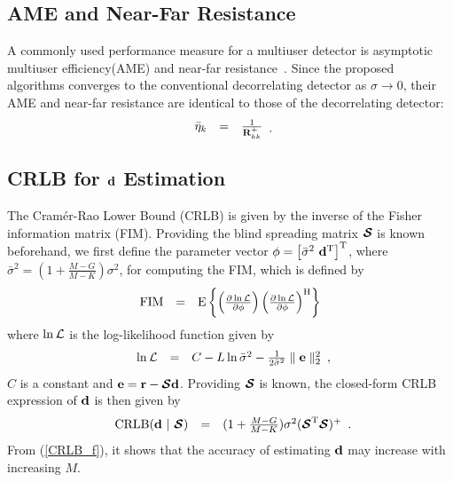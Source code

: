 \documentclass[a4paper,10pt,fleqn, twocolumn]{IEEETran}
\newcommand{\br}{{\mathbf r}}
\newcommand{\bbf}{{\bf d}}
\newcommand{\bR}{{\bf R}}
\newcommand{\bcS}{{\mbox {\boldmath ${\cal S}$}}}
\begin{document}
{\subsection{AME and Near-Far Resistance}
A commonly used performance measure for a multiuser detector is
asymptotic multiuser efficiency(AME) and near-far
resistance~\cite{Verd98}. Since the proposed algorithms converges
to the conventional decorrelating detector as $\sigma\rightarrow
0$, their AME and near-far resistance are identical to those of
the decorrelating detector:
\begin{equation}
\begin{array}{rcl}
\bar{\eta}_k&=&\frac{1}{\bR_{kk}^{+}}
\end{array}.
\end{equation}
\subsection{CRLB for $\bbf$ Estimation}
The Cram\'{e}r-Rao Lower Bound (CRLB) is given by the inverse of
the Fisher information matrix (FIM). Providing the blind spreading
matrix $\bcS$ is known beforehand, we first define the parameter
vector $\mathbf{\phi} = \left[\bar{\sigma}^{2}\ \bbf^{\rm
T}\right]^{\rm T}$, where $\bar{\sigma}^{2}
=(1+\frac{M-G}{M-K})\sigma^{2}$, for computing the FIM, which is
defined by
\begin{equation}
\begin{array}{rcl}
{\rm FIM} &=& {\rm E} \left\{ \left( \frac{\partial \ln{\cal
L}}{\partial \mathbf{\phi}} \right) \left( \frac{\partial \ln{\cal
L}}{\partial \mathbf{\phi}} \right)^{\rm H} \right\} \label{fim}
\end{array}
\end{equation}
\noindent where $\ln{\cal L}$ is the log-likelihood function given
by
\begin{equation}
\begin{array}{rcl}
\ln{\cal
L}&=&C-L\ln\bar{\sigma}^2-\frac{1}{2\bar{\sigma}^2}\parallel\mathbf{e}\parallel_2^2
\end{array},\label{logl}
\end{equation}
\noindent $C$ is a constant and $\mathbf{e}=\br-\bcS\bbf$.
Providing $\bcS$ is known, the closed-form CRLB expression of
$\bbf$ is then given by
\begin{equation}
\begin{array}{rcl}
{\rm CRLB}(\bbf\ |\ \bcS) &
=&(1+\frac{M-G}{M-K})\sigma^{2}(\bcS^{\rm T}\bcS)^{\rm +}
\end{array}.\label{CRLB_f}
\end{equation}
\noindent From (\ref{CRLB_f}), it shows that the accuracy of
estimating $\bbf$ may increase with increasing $M$.


}
\end{document}
